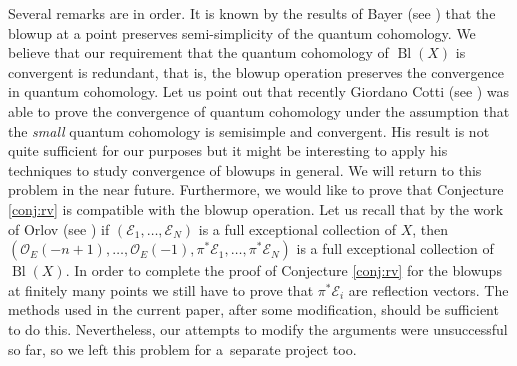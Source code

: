 \documentclass[10pt,a4paper]{article}
\numberwithin{equation}{section}
\renewcommand{\O}{\mathcal{O}}
\newcommand{\E}{\mathcal{E}}
\begin{document}
Several remarks are in order. It is known by the results of Bayer (see
\cite{Ba}) that the blowup at a point preserves semi-simplicity of the
quantum cohomology. We believe that our requirement that the quantum
cohomology of $\operatorname{Bl}(X)$ is convergent is redundant, that
is, the blowup operation preserves the convergence in quantum
cohomology. Let us point out that recently Giordano Cotti (see
\cite[Theorem 6.6]{Cotti2021})
was able to prove the convergence of quantum cohomology under the
assumption that the {\em small} quantum cohomology is semisimple and
convergent. His result is not quite sufficient for our purposes but
it might be interesting to apply his techniques to study convergence
of blowups in general. We will return to this problem in the near future.
Furthermore, we would like to prove
that Conjecture \ref{conj:rv} is compatible with the blowup
operation. Let us recall that by the work of Orlov (see \cite{Orlov}) if
$(\E_1,\dots,\E_N)$ is a full exceptional collection of $X$, then
$(\O_E(-n+1), \dots, \O_E(-1), \pi^*\E_1,\dots,\pi^*\E_N)$ is a full
exceptional collection of $\operatorname{Bl}(X)$. In order to complete
the proof of Conjecture \ref{conj:rv} for the blowups at finitely many
points we still have to prove that $\pi^*\E_i$ are reflection
vectors. The methods used in the current paper, after some modification,
should be sufficient to do this. Nevertheless, our attempts to modify
the arguments were unsuccessful so far, so we left this problem for a~separate project too.
\end{document}

